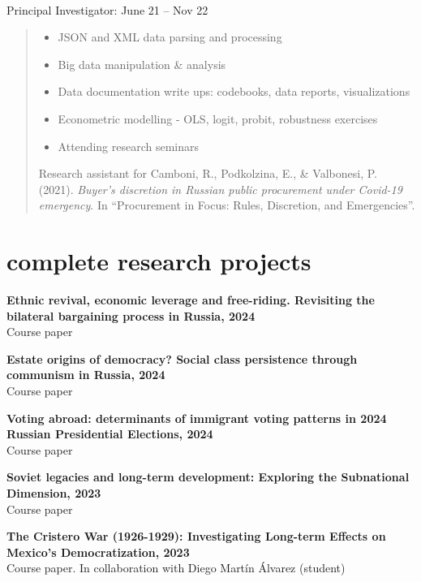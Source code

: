 \documentclass[11pt]{article}
\newcommand{\entry}[4]{{{\textbf{#1}}} \hfill #3 \\ #2 \hfill #4}
\begin{document}
\smallskip

\entry{\href{https://cinst.hse.ru/en/pprocurement/}{\color{blue-violet}{Economics of Public Procurement}}}{Principal Investigator: \href{https://www.hse.ru/en/staff/epodkolzina}{\color{blue-violet}{Elena Podkolzina}}}{}{June 21 -- Nov 22}

\begin{quote}
\begin{itemize}[noitemsep,leftmargin=3.5mm,rightmargin=0mm,topsep=6pt]
  \item JSON and XML data parsing and processing
  \item Big data manipulation \& analysis
  \item Data documentation write ups: codebooks, data reports, visualizations
  \item Econometric modelling - OLS, logit, probit, robustness exercises
  \item Attending research seminars
\end{itemize}

\raggedright
Research assistant for Camboni, R., Podkolzina, E., \& Valbonesi, P. (2021). \textit{Buyer’s discretion in Russian public procurement under Covid-19 emergency}. In ``Procurement in Focus: Rules, Discretion, and Emergencies''.
\end{quote}

\section{complete research projects}

\newpage

\entry{Ethnic revival, economic leverage and free-riding. Revisiting the bilateral bargaining process in Russia, 2024}{Course paper}{}{}

\smallskip

\entry{Estate origins of democracy? Social class persistence through communism in Russia, 2024}{Course paper}{}{}

\smallskip

\entry{Voting abroad: determinants of immigrant voting patterns in 2024 Russian Presidential Elections, 2024}{Course paper}{}{}

\smallskip

\entry{Soviet legacies and long-term development: Exploring the Subnational Dimension, 2023}{Course paper}{}{}

\smallskip

\entry{The Cristero War (1926-1929): Investigating Long-term Effects on Mexico's Democratization, 2023}{Course paper. In collaboration with Diego Martín Álvarez (student)}{}{}
\end{document}
